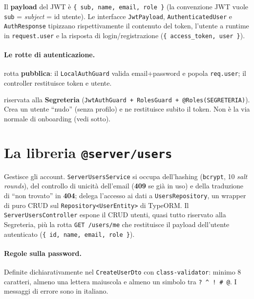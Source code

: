 \documentclass[11pt,a4paper,oneside]{report}
\newcommand{\code}[1]{\texttt{\small #1}}
\begin{document}
Il \textbf{payload} del JWT è \code{\{ sub, name, email, role \}} (la convenzione
JWT vuole \code{sub} = \emph{subject} = id utente). Le interfacce
\code{JwtPayload}, \code{AuthenticatedUser} e \code{AuthResponse} tipizzano
rispettivamente il contenuto del token, l'utente a runtime in \code{request.user}
e la risposta di login/registrazione (\code{\{ access\_token, user \}}).

\paragraph{Le rotte di autenticazione.}
\begin{description}[leftmargin=1.6em,style=nextline]
  \item[\code{POST /auth/login}] rotta \textbf{pubblica}: il \code{LocalAuthGuard}
        valida email+password e popola \code{req.user}; il controller restituisce
        token e utente.
  \item[\code{POST /auth/register}] riservata alla \textbf{Segreteria}
        (\code{JwtAuthGuard + RolesGuard + @Roles(SEGRETERIA)}). Crea un utente
        ``nudo'' (senza profilo) e ne restituisce subito il token. Non è la via
        normale di onboarding (vedi sotto).
\end{description}

\section{La libreria \texttt{@server/users}}
Gestisce gli account. \code{ServerUsersService} si occupa dell'hashing
(\code{bcrypt}, 10 \emph{salt rounds}), del controllo di unicità dell'email
(\textbf{409} se già in uso) e della traduzione di ``non trovato'' in
\textbf{404}; delega l'accesso ai dati a \code{UsersRepository}, un wrapper di
puro CRUD sul \code{Repository<UserEntity>} di TypeORM. Il \code{ServerUsersController}
espone il CRUD utenti, quasi tutto riservato alla Segreteria, più la rotta
\code{GET /users/me} che restituisce il payload dell'utente autenticato
(\code{\{ id, name, email, role \}}).

\paragraph{Regole sulla password.} Definite dichiarativamente nel
\code{CreateUserDto} con \code{class-validator}: minimo 8 caratteri, almeno una
lettera maiuscola e almeno un simbolo tra \code{? \^{} ! \# @}. I messaggi di
errore sono in italiano.
\end{document}
